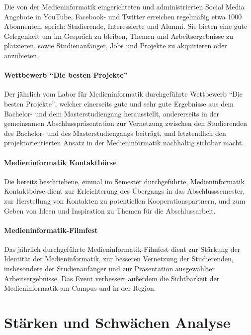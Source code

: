 Die von der Medieninformatik eingerichteten und administrierten Social
Media Angebote in YouTube, Facebook- und Twitter erreichen regelmäßig
etwa 1000 Abonnenten, sprich: Studierende, Interessierte und Alumni. Sie
bieten eine gute Gelegenheit um im Gespräch zu bleiben, Themen und
Arbeitsergebnisse zu platzieren, sowie Studienanfänger, Jobs und
Projekte zu akquirieren oder anzubieten.

\paragraph{\texorpdfstring{Wettbewerb ``Die besten
Projekte''}{Wettbewerb Die besten Projekte}}\label{wettbewerb-die-besten-projekte}

Der jährlich vom Labor für Medieninformatik durchgeführte Wettbewerb
``Die besten Projekte'', welcher einerseits gute und sehr gute
Ergebnisse aus dem Bachelor- und dem Masterstudiengang herausstellt,
andererseits in der gemeinsamen Abschlusspräsentation zur Vernetzung
zwischen den Studierenden des Bachelor- und des Masterstudiengangs
beiträgt, und letztendlich den projektorientierten Ansatz in der
Medieninformatik nachhaltig sichtbar macht.

\paragraph{Medieninformatik
Kontaktbörse}\label{medieninformatik-kontaktbuxf6rse}

Die bereits beschriebene, einmal im Semester durchgeführte,
Medieninformatik Kontaktbörse dient zur Erleichterung des Übergangs in
das Abschlusssemester, zur Herstellung von Kontakten zu potentiellen
Kooperationspartnern, und zum Geben von Ideen und Inspiration zu Themen
für die Abschlussarbeit.

\paragraph{Medieninformatik-Filmfest}\label{medieninformatik-filmfest}

Das jährlich durchgeführte Medieninformatik-Filmfest dient zur Stärkung
der Identität der Medieninformatik, zur besseren Vernetzung der
Studierenden, insbesondere der Studienanfänger und zur Präsentation
ausgewählter Arbeitsergebnisse. Das Event verbessert außerdem die
Sichtbarkeit der Medieninformatik am Campus und in der Region.

\section{Stärken und Schwächen
Analyse}\label{stuxe4rken-und-schwuxe4chen-analyse}

